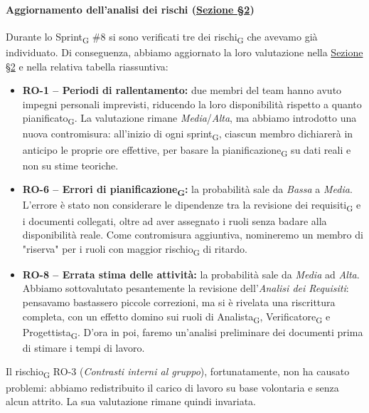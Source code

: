 ﻿\documentclass[a4paper, 10pt, colorlinks=true, linkcolor=black, urlcolor=blue, citecolor=blue, hidelinks]{article}
\begin{document}
\paragraph{Aggiornamento dell'analisi dei rischi (\hyperref[tab:gestione-rischi]{Sezione \S2})}
Durante lo Sprint\textsubscript{G} \#8 si sono verificati tre dei rischi\textsubscript{G} che avevamo già individuato. Di conseguenza, abbiamo aggiornato la loro valutazione nella \hyperref[tab:gestione-rischi]{Sezione \S2} e nella relativa tabella riassuntiva:
\begin{itemize}
    \item \textbf{RO-1 -- Periodi di rallentamento:} due membri del team hanno avuto impegni personali imprevisti, riducendo la loro disponibilità rispetto a quanto pianificato\textsubscript{G}. La valutazione rimane \textit{Media}/\textit{Alta}, ma abbiamo introdotto una nuova contromisura: all'inizio di ogni sprint\textsubscript{G}, ciascun membro dichiarerà in anticipo le proprie ore effettive, per basare la pianificazione\textsubscript{G} su dati reali e non su stime teoriche.

    \item \textbf{RO-6 -- Errori di pianificazione\textsubscript{G}:} la probabilità sale da \textit{Bassa} a \textit{Media}. L'errore è stato non considerare le dipendenze tra la revisione dei requisiti\textsubscript{G} e i documenti collegati, oltre ad aver assegnato i ruoli senza badare alla disponibilità reale. Come contromisura aggiuntiva, nomineremo un membro di "riserva" per i ruoli con maggior rischio\textsubscript{G} di ritardo.

    \item \textbf{RO-8 -- Errata stima delle attività:} la probabilità sale da \textit{Media} ad \textit{Alta}. Abbiamo sottovalutato pesantemente la revisione dell'\textit{Analisi dei Requisiti}: pensavamo bastassero piccole correzioni, ma si è rivelata una riscrittura completa, con un effetto domino sui ruoli di Analista\textsubscript{G}, Verificatore\textsubscript{G} e Progettista\textsubscript{G}. D'ora in poi, faremo un'analisi preliminare dei documenti prima di stimare i tempi di lavoro.
\end{itemize}
Il rischio\textsubscript{G} RO-3 (\textit{Contrasti interni al gruppo}), fortunatamente, non ha causato problemi: abbiamo redistribuito il carico di lavoro su base volontaria e senza alcun attrito. La sua valutazione rimane quindi invariata.
\end{document}
